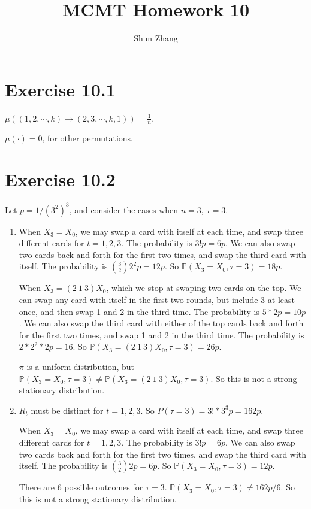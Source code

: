 \documentclass[10pt]{article}
\title{MCMT Homework 10}
\author{Shun Zhang}
\date{}
\renewcommand{\P}{\mathbb{P}}
\begin{document}
\maketitle

\section*{Exercise 10.1}

$\mu((1, 2, \cdots, k) \rightarrow (2, 3, \cdots, k, 1)) = \frac{1}{n}$.

$\mu(\cdot) = 0$, for other permutations.

\section*{Exercise 10.2}

Let $p = 1 / (3^2)^3$, and consider the cases when $n = 3$, $\tau = 3$.

\begin{enumerate}
\item 
When $X_3 = X_0$, we may swap a card with itself at each time, and swap three
different cards for $t = 1, 2, 3$. The probability is $3!p = 6p$. We can also swap
two cards back and forth for the first two times, and swap the third card with
itself. The probability is ${3 \choose 2} 2^2p = 12p$. So $\P(X_3 = X_0, \tau = 3)
= 18p$.

When $X_3 = (2\ 1\ 3)X_0$, which we stop at swaping two cards on the top. We can
swap any card with itself in the first two rounds, but include 3 at least once,
and then swap 1 and 2 in the third time. The probability is $5 * 2p = 10p$.
We can also swap the third card with either of the top cards back and forth for
the first two times, and swap 1 and 2 in the third time. The probability is $2 *
2^2 * 2p = 16$. So $\P(X_3 = (2\ 1\ 3)X_0, \tau = 3) = 26p$.

$\pi$ is a uniform distribution, but $\P(X_3 = X_0, \tau = 3) \neq \P(X_3 = (2\
1\ 3)X_0, \tau = 3)$. So this is not a strong stationary distribution.

\item 
$R_t$ must be distinct for $t = 1, 2, 3$. So $P(\tau = 3) = 3! * 3^3p = 162p$.

When $X_3 = X_0$, we may swap a card with itself at each time, and swap three
different cards for $t = 1, 2, 3$. The probability is $3!p = 6p$. We can also swap
two cards back and forth for the first two times, and swap the third card with
itself. The probability is ${3 \choose 2} 2p = 6p$. So $\P(X_3 = X_0, \tau = 3)
= 12p$.

There are 6 possible outcomes for $\tau = 3$. $\P(X_3 = X_0, \tau = 3) \neq 162p
/ 6$. So this is not a strong stationary distribution.

\end{enumerate}
\end{document}
